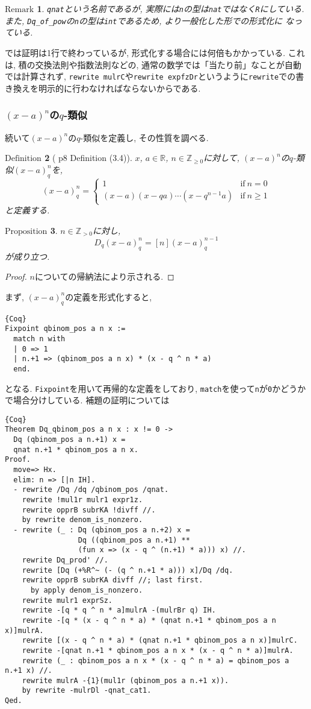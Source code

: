 \documentclass[11pt]{jarticle}
\theoremstyle{mystyle}
\newtheorem{df}{$\textrm{Definition}$}[subsubsection]
\newtheorem{prop}[df]{$\textrm{Proposition}$}
\newtheorem{rmk}[df]{$\textrm{Remark}$}
\newcommand{\bdf}{\begin{shadebox} \begin{df}}
\newcommand{\edf}{\end{df} \end{shadebox}}
\newcommand{\bprop}{\begin{shadebox} \begin{prop}}
\newcommand{\eprop}{\end{prop} \end{shadebox}}
\newcommand{\brmk}{\begin{rmk}}
\newcommand{\ermk}{\end{rmk}}
\newcommand{\bpf}{\begin{proof}}
\newcommand{\epf}{\end{proof}}
\newcommand{\Z}{\mathbb{Z}}
\newcommand{\R}{\mathbb{R}}
\newcommand{\0}{\textbf{0}}
\newcommand{\1}{\textbf{1}}
\newcommand{\2}{\textbf{2}}
\begin{document}
\brmk
  {\tt qnat}という名前であるが, 実際には{\tt n}の型は{\tt nat}ではなく{\tt R}にしている. 
  また, {\tt Dq\_of\_pow}の{\tt n}の型は{\tt int}であるため, より一般化した形での形式化に
  なっている. 
\ermk
\cite{Kac}では証明は1行で終わっているが, 形式化する場合には何倍もかかっている. これは, 積の交換法則や指数法則などの, 通常の数学では「当たり前」なことが自動では計算されず, {\tt rewrite mulrC}や{\tt rewrite expfzDr}というように{\tt rewrite}での書き換えを明示的に行わなければならないからである. \\
\subsubsection{$(x - a)^n$の$q$-類似}
続いて$(x - a)^n$の$q$-類似を定義し, その性質を調べる.  
\bdf[\cite{Kac} p8 Definition (3.4)]
  $x$, $a \in \R$, $n \in \Z_{\ge 0}$に対して, $(x - a)^n$の$q$-類似$(x - a)^n_q$を, 
  \[
  (x - a)^n_q = \begin{cases}
                      1 & \text{if}\ n = 0 \\
                      (x - a) (x - qa) \cdots (x - q^{n - 1} a) & \text{if}\ n \ge 1
                    \end{cases}
  \]
  と定義する. 
\edf
\bprop \label{Dq_qbinom_nonneg}
  $n\in\Z_{>0}$に対し, 
  \[
    D_q(x-a)^n_q = [n](x-a)^{n-1}_q
  \]
  が成り立つ. 
\eprop
\bpf
  $n$についての帰納法により示される. 
\epf
まず, $(x - a)^n_q$の定義を形式化すると, 
\begin{lstlisting}{Coq}
Fixpoint qbinom_pos a n x :=
  match n with
  | 0 => 1
  | n.+1 => (qbinom_pos a n x) * (x - q ^ n * a)
  end.
\end{lstlisting}
となる. {\tt Fixpoint}を用いて再帰的な定義をしており, {\tt match}を使って{\tt n}が{\tt 0}かどうかで場合分けしている. 補題の証明については 
\begin{lstlisting}{Coq}
Theorem Dq_qbinom_pos a n x : x != 0 ->
  Dq (qbinom_pos a n.+1) x =
  qnat n.+1 * qbinom_pos a n x.
Proof.
  move=> Hx.
  elim: n => [|n IH].
  - rewrite /Dq /dq /qbinom_pos /qnat.
    rewrite !mul1r mulr1 expr1z.
    rewrite opprB subrKA !divff //.
    by rewrite denom_is_nonzero.
  - rewrite (_ : Dq (qbinom_pos a n.+2) x =
                 Dq ((qbinom_pos a n.+1) **
                 (fun x => (x - q ^ (n.+1) * a))) x) //.
    rewrite Dq_prod' //.
    rewrite [Dq (+%R^~ (- (q ^ n.+1 * a))) x]/Dq /dq.
    rewrite opprB subrKA divff //; last first.
      by apply denom_is_nonzero.
    rewrite mulr1 exprSz.
    rewrite -[q * q ^ n * a]mulrA -(mulrBr q) IH.
    rewrite -[q * (x - q ^ n * a) * (qnat n.+1 * qbinom_pos a n x)]mulrA.
    rewrite [(x - q ^ n * a) * (qnat n.+1 * qbinom_pos a n x)]mulrC.
    rewrite -[qnat n.+1 * qbinom_pos a n x * (x - q ^ n * a)]mulrA.
    rewrite (_ : qbinom_pos a n x * (x - q ^ n * a) = qbinom_pos a n.+1 x) //.
    rewrite mulrA -{1}(mul1r (qbinom_pos a n.+1 x)).
    by rewrite -mulrDl -qnat_cat1.
Qed.
\end{lstlisting}
\end{document}
